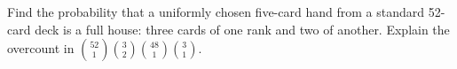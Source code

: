 Find the probability that a uniformly chosen five-card hand from a standard 52-card deck is a full house: three cards of one rank and two of another. Explain the overcount in $\binom{52}{1}\binom32\binom{48}{1}\binom31$.
